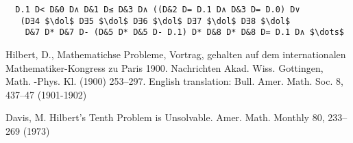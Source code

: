 \documentclass{llncs}
\newcommand{\dol}{\mbox{\textdollar}}
\begin{document}
\begin{lstlisting}
  D.1 D< D&0 D∧ D&1 D≤ D&3 D∧ ((D&2 D= D.1 D∧ D&3 D= D.0) D∨
   (D∃4 $\dol$ D∃5 $\dol$ D∃6 $\dol$ D∃7 $\dol$ D∃8 $\dol$
    D&7 D* D&7 D- (D&5 D* D&5 D- D.1) D* D&8 D* D&8 D= D.1 D∧ $\dots$
\end{lstlisting}
%
%
\begin{thebibliography}{5}
%
Hilbert, D., Mathematichse Probleme, Vortrag, gehalten auf dem internationalen Mathematiker-Kongress zu Paris 1900. Nachrichten Akad. Wiss. Gottingen, Math. -Phys. Kl. (1900) 253--297. English translation: Bull. Amer. Math. Soc. 8, 437--47 (1901-1902)

Davis, M. Hilbert's Tenth Problem is Unsolvable. Amer. Math. Monthly 80, 233--269 (1973)
\end{thebibliography}
\end{document}
